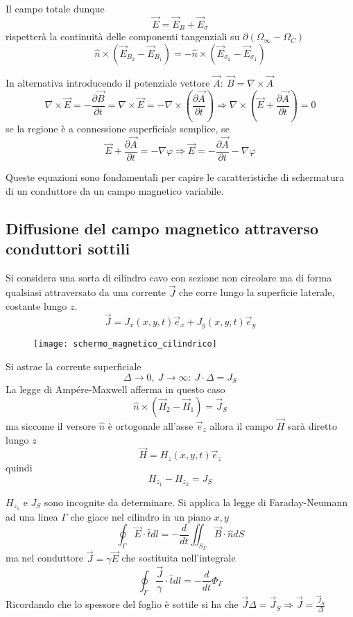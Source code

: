 Il campo totale dunque
$$
\vec{E} = \vec{E}_B + \vec{E}_\sigma
$$
rispetterà la continuità delle componenti tangenziali su $\partial\left(\Omega_\infty-\Omega_C\right)$
$$
\hat{n}\times\left(\vec{E}_{B_2} - \vec{E}_{B_1}\right) = -\hat{n}\times\left(\vec{E}_{\sigma_2} - \vec{E}_{\sigma_1}\right)
$$

In alternativa introducendo il potenziale vettore $\vec{A}:\ \vec{B}=\nabla\times\vec{A}$
$$
\nabla\times\vec{E} = -\frac{\partial\vec{B}}{\partial t} = \nabla\times\vec{E} = -\nabla
\times\left(\frac{\partial\vec{A}}{\partial t}\right) \Rightarrow \nabla\times\left(
\vec{E}+\frac{\partial\vec{A}}{\partial t}\right) = 0
$$
se la regione è a connessione superficiale semplice, se 
$$
\vec{E} + \frac{\partial \vec{A}}{\partial t} = -\nabla\varphi \Rightarrow \vec{E} = 
-\frac{\partial \vec{A}}{\partial t} - \nabla\varphi
$$


Queste equazioni sono fondamentali per capire le caratteristiche di schermatura di un 
conduttore da un campo magnetico variabile.

\newpage
\subsection{Diffusione del campo magnetico attraverso conduttori sottili}
Si considera una sorta di cilindro cavo con sezione non circolare ma di forma qualsiasi
attraversato da una corrente $\vec{J}$ che corre lungo la superficie laterale, costante
lungo $z$.
$$
\vec{J} = J_x \left(x,y,t\right)\vec{e}_x + J_y\left(x,y,t\right)\vec{e}_y
$$
\begin{figure}[H]
\centering
\texttt{[image: schermo\_magnetico\_cilindrico]}
\end{figure}
Si astrae la corrente superficiale
$$
\Delta\to 0,\ J\to \infty:\ J\cdot\Delta = J_S
$$
La legge di Ampére-Maxwell afferma in questo caso
$$
\hat{n}\times\left(\vec{H}_2-\vec{H}_1\right) = \vec{J}_S
$$
ma siccome il versore $\hat{n}$ è ortogonale all'asse $\vec{e}_z$
allora il campo $\vec{H}$ sarà diretto lungo $z$
$$
\vec{H} = H_z\left(x,y,t\right)\vec{e}_z
$$
quindi
$$
H_{z_1} - H_{z_2} = J_S
$$

$H_{z_1}$ e $J_S$ sono incognite da determinare.
Si applica la legge di Faraday-Neumann ad una linea $\Gamma$ che giace nel cilindro
in un piano $x,y$
$$
\oint_\Gamma \vec{E}\cdot\hat{t}dl = -\frac{d}{dt} \iint_{S_\Gamma} \vec{B}\cdot\hat{n}dS
$$
ma nel conduttore $\vec{J} = \gamma\vec{E}$ che sostituita nell'integrale
$$
\oint_\Gamma \frac{\vec{J}}{\gamma}\cdot\hat{t}dl = -\frac{d}{dt} \Phi_\Gamma
$$
Ricordando che lo spessore del foglio è sottile si ha che $\vec{J}\Delta = \vec{J}_S \Rightarrow \vec{J} = \frac{\vec{J}_S}{\Delta}$

